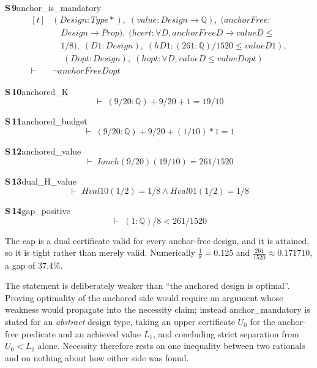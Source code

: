 \documentclass[conference]{IEEEtran}
\theoremstyle{definition}
\newcommand{\lean}[1]{\textsf{\footnotesize #1}}
\begin{document}
\noindent\textbf{S\,9}\quad\lean{anchor\_is\_mandatory}
{\footnotesize\[ \begin{aligned}[t]
&(\mathit{Design} : \mathit{Type}*),\; (\mathit{value} : \mathit{Design} \to \mathbb{Q} ),\; (\mathit{anchorFree} :\\
&\quad \mathit{Design} \to \mathit{Prop}),\; (\mathit{hcert} : \forall \mathit{D}, \mathit{anchorFree} \mathit{D} \to \mathit{value} \mathit{D} \leq\\
&\quad 1/8),\; (\mathit{D1} : \mathit{Design}),\; (\mathit{hD1} : (261 : \mathbb{Q} )/1520 \leq \mathit{value} \mathit{D1}),\\
&\quad \; (\mathit{Dopt} : \mathit{Design}),\; (\mathit{hopt} : \forall \mathit{D}, \mathit{value} \mathit{D} \leq \mathit{value} \mathit{Dopt})\\
\vdash\;&\neg \mathit{anchorFree} \mathit{Dopt}
\end{aligned} \]}

\noindent\textbf{S\,10}\quad\lean{anchored\_K}
{\footnotesize\[ \vdash\; (9/20 : \mathbb{Q} ) + 9/20 + 1 = 19/10 \]}

\noindent\textbf{S\,11}\quad\lean{anchored\_budget}
{\footnotesize\[ \vdash\; (9/20 : \mathbb{Q} ) + 9/20 + (1/10) * 1 = 1 \]}

\noindent\textbf{S\,12}\quad\lean{anchored\_value}
{\footnotesize\[ \vdash\; \mathit{Ianch} (9/20) (19/10) = 261 / 1520 \]}

\noindent\textbf{S\,13}\quad\lean{dual\_H\_value}
{\footnotesize\[ \vdash\; \mathit{Hval} 1 0 (1/2) = 1 / 8 \wedge \mathit{Hval} 0 1 (1/2) = 1 / 8 \]}

\noindent\textbf{S\,14}\quad\lean{gap\_positive}
{\footnotesize\[ \vdash\; (1 : \mathbb{Q} ) / 8 < 261 / 1520 \]}


The cap is a dual certificate valid for every anchor-free design, and it is attained, so it
is tight rather than merely valid. Numerically $\tfrac18=0.125$ and
$\tfrac{261}{1520}\approx0.171710$, a gap of $37.4\%$.

The statement is deliberately weaker than ``the anchored design is optimal''. Proving
optimality of the anchored side would require an argument whose weakness would propagate
into the necessity claim; instead \lean{anchor\_mandatory} is stated for an \emph{abstract}
design type, taking an upper certificate $U_{0}$ for the anchor-free predicate and an
achieved value $L_{1}$, and concluding strict separation from $U_{0}<L_{1}$ alone. Necessity
therefore rests on one inequality between two rationals and on nothing about how either side
was found.
\end{document}
